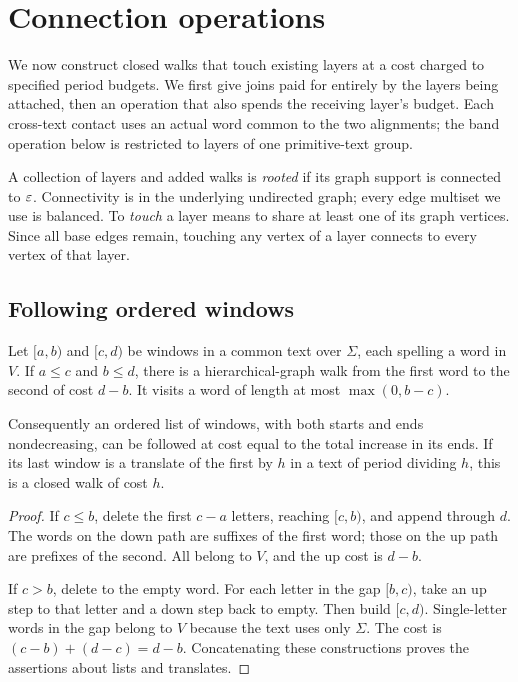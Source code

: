 \section{Connection operations}\label{sec:connections}

We now construct closed walks that touch existing layers at a cost charged to specified period budgets. We first give joins paid for entirely by the layers being attached, then an operation that also spends the receiving layer's budget. Each cross-text contact uses an actual word common to the two alignments; the band operation below is restricted to layers of one primitive-text group.

A collection of layers and added walks is \emph{rooted} if its graph support is connected to $\varepsilon$. Connectivity is in the underlying undirected graph; every edge multiset we use is balanced. To \emph{touch} a layer means to share at least one of its graph vertices. Since all base edges remain, touching any vertex of a layer connects to every vertex of that layer.

\subsection{Following ordered windows}

\begin{lemma}\label{lem:ordered-windows}
Let $[a,b)$ and $[c,d)$ be windows in a common text over $\Sigma$, each spelling a word in $V$. If $a\le c$ and $b\le d$, there is a hierarchical-graph walk from the first word to the second of cost $d-b$. It visits a word of length at most $\max(0,b-c)$.

Consequently an ordered list of windows, with both starts and ends nondecreasing, can be followed at cost equal to the total increase in its ends. If its last window is a translate of the first by $h$ in a text of period dividing $h$, this is a closed walk of cost $h$.
\end{lemma}

\begin{proof}
If $c\le b$, delete the first $c-a$ letters, reaching $[c,b)$, and append through $d$. The words on the down path are suffixes of the first word; those on the up path are prefixes of the second. All belong to $V$, and the up cost is $d-b$.

If $c>b$, delete to the empty word. For each letter in the gap $[b,c)$, take an up step to that letter and a down step back to empty. Then build $[c,d)$. Single-letter words in the gap belong to $V$ because the text uses only $\Sigma$. The cost is $(c-b)+(d-c)=d-b$. Concatenating these constructions proves the assertions about lists and translates.
\end{proof}


